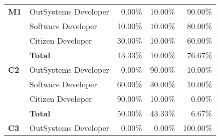 \begin{table}[tb]
\begin{tabular}{@{}llrrr@{}}
    \textbf{M1}               & OutSystems Developer & 0.00\%                                                            & 10.00\%                                                                 & 90.00\%                                                       \\
                              & Software Developer   & 10.00\%                                                           & 10.00\%                                                                 & 80.00\%                                                       \\
                              & Citizen Developer    & 30.00\%                                                           & 10.00\%                                                                 & 60.00\%                                                       \\
                              & \textbf{Total}       & 13.33\%                                                           & 10.00\%                                                                 & 76.67\%                                                       \\ \midrule
    \textbf{C2}               & OutSystems Developer & 0.00\%                                                            & 90.00\%                                                                 & 10.00\%                                                        \\
                              & Software Developer   & 60.00\%                                                           & 30.00\%                                                                 & 10.00\%                                                       \\
                              & Citizen Developer    & 90.00\%                                                           & 10.00\%                                                                 & 0.00\%                                                        \\
                              & \textbf{Total}       & 50.00\%                                                           & 43.33\%                                                                 & 6.67\%                                                        \\ \midrule
    \textbf{C3}               & OutSystems Developer & 0.00\%                                                            & 0.00\%                                                                  & 100.00\%                                                      \\

\end{tabular}
\end{table}
